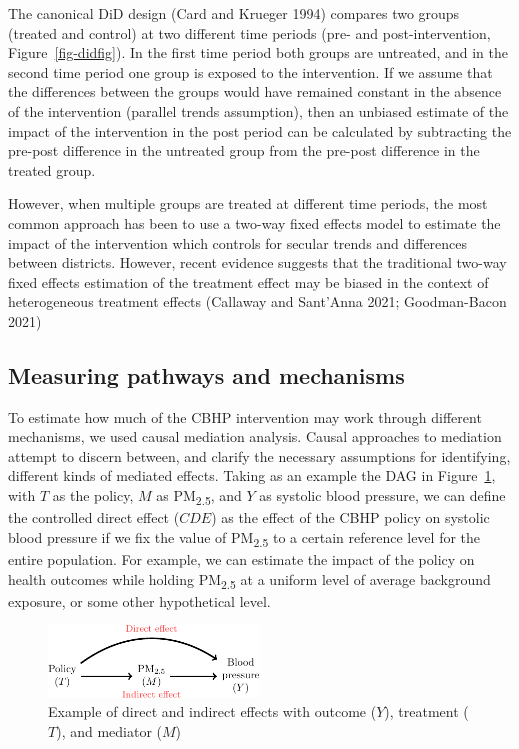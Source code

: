 \documentclass[
  letterpaper,
  DIV=11,
  numbers=noendperiod]{scrartcl}
\begin{document}
The canonical DiD design (Card and Krueger 1994) compares two groups
(treated and control) at two different time periods (pre- and
post-intervention, Figure~\ref{fig-didfig}). In the first time period
both groups are untreated, and in the second time period one group is
exposed to the intervention. If we assume that the differences between
the groups would have remained constant in the absence of the
intervention (parallel trends assumption), then an unbiased estimate of
the impact of the intervention in the post period can be calculated by
subtracting the pre-post difference in the untreated group from the
pre-post difference in the treated group.

However, when multiple groups are treated at different time periods, the
most common approach has been to use a two-way fixed effects model to
estimate the impact of the intervention which controls for secular
trends and differences between districts. However, recent evidence
suggests that the traditional two-way fixed effects estimation of the
treatment effect may be biased in the context of heterogeneous treatment
effects (Callaway and Sant'Anna 2021; Goodman-Bacon 2021)

\hypertarget{measuring-pathways-and-mechanisms}{%
\subsection{Measuring pathways and
mechanisms}\label{measuring-pathways-and-mechanisms}}

To estimate how much of the CBHP intervention may work through different
mechanisms, we used causal mediation analysis. Causal approaches to
mediation attempt to discern between, and clarify the necessary
assumptions for identifying, different kinds of mediated effects. Taking
as an example the DAG in Figure~\ref{fig-dag1}, with \(T\) as the
policy, \(M\) as PM\textsubscript{2.5}, and \(Y\) as systolic blood
pressure, we can define the controlled direct effect (\(CDE\)) as the
effect of the CBHP policy on systolic blood pressure if we fix the value
of PM\textsubscript{2.5} to a certain reference level for the entire
population. For example, we can estimate the impact of the policy on
health outcomes while holding PM\textsubscript{2.5} at a uniform level
of average background exposure, or some other hypothetical level.

\begin{figure}[H]

{\centering \includegraphics[width=0.5\textwidth,height=\textheight]{hei-report_files/figure-pdf/fig-dag1-1.pdf}

}

\caption{\label{fig-dag1}Example of direct and indirect effects with
outcome (\(Y\)), treatment (\(T\)), and mediator (\(M\))}

\end{figure}
\end{document}
